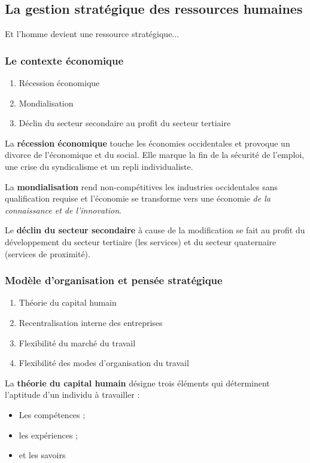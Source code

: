 \documentclass[12pt]{article}
\begin{document}
	\subsection{La gestion stratégique des ressources humaines}
	Et l’homme devient une ressource stratégique...
		\subsubsection{Le contexte économique}
		\begin{enumerate}
		 \item Récession économique
		 \item Mondialisation
		 \item Déclin du secteur secondaire au profit du secteur tertiaire
		\end{enumerate}
		
		La \textbf{récession économique} touche les économies occidentales et provoque un divorce de l'économique et du social. Elle marque la fin de la sécurité de l'emploi, une crise du syndicalisme et un repli individualiste.
		
		La \textbf{mondialisation} rend non-compétitives les industries occidentales sans qualification requise et l'économie se transforme vers une économie \emph{de la connaissance et de l'innovation}.
		
		Le \textbf{déclin du secteur secondaire} à cause de la modification se fait au profit du développement du secteur tertiaire (les services) et du secteur quaternaire (services de proximité).
		
		\subsubsection{Modèle d’organisation et pensée stratégique}
		
		\begin{enumerate}
		 \item Théorie du capital humain
		 \item Recentralisation interne des entreprises
		 \item Flexibilité du marché du travail
		 \item Flexibilité des modes d'organisation du travail
		\end{enumerate}
		
		La \textbf{théorie du capital humain} désigne trois éléments qui déterminent l'aptitude d'un individu à travailler :
		
		\begin{itemize}
		 \item Les compétences ;
		 \item les expériences ;
		 \item et les savoirs
		\end{itemize}
		
\end{document}

